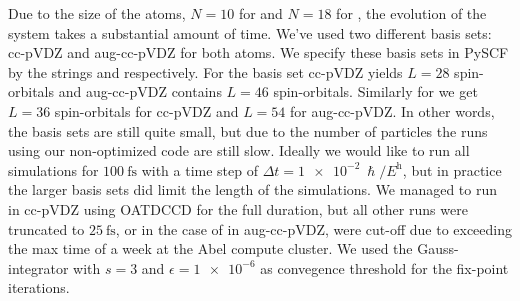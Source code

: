        Due to the size of the atoms, $N = 10$ for  and $N = 18$ for
        , the evolution of the system takes a substantial amount of time.
        We've used two different basis sets: cc-pVDZ and aug-cc-pVDZ for both
        atoms.
        We specify these basis sets in PySCF \cite{pyscf} by the strings
         and  respectively.
        For  the basis set cc-pVDZ yields $L = 28$ spin-orbitals and
        aug-cc-pVDZ contains $L = 46$ spin-orbitals.
        Similarly for  we get $L = 36$ spin-orbitals for cc-pVDZ and $L =
        54$ for aug-cc-pVDZ.
        In other words, the basis sets are still quite small, but due to the
        number of particles the runs using our non-optimized code are still
        slow.
        Ideally we would like to run all simulations for $\SI{100}{\fs}$ with a
        time step of $\Delta t = \SI{1e-2}{\hslash/\hartree}$, but in
        practice the larger basis sets did limit the length of the simulations.
        We managed to run  in cc-pVDZ using OATDCCD for the full
        duration, but all other runs were truncated to $\SI{25}{\fs}$, or in the
        case of  in aug-cc-pVDZ, were cut-off due to exceeding the max
        time of a week at the Abel compute cluster.
        We used the Gauss-integrator with $s = 3$ and $\epsilon = \num{1e-6}$ as
        convegence threshold for the fix-point iterations.

